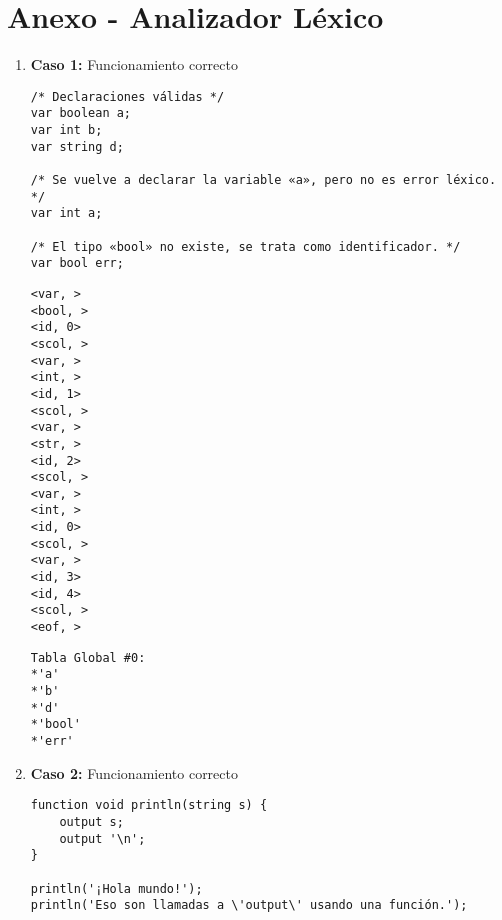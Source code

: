 \appendix
\section{Anexo - Analizador Léxico}


\begin{enumerate}

    \item \textbf{Caso 1:} Funcionamiento correcto
    \begin{tcolorbox}[title={Código fuente}, colback=white]
        \begin{lstlisting}
/* Declaraciones válidas */
var boolean a;
var int b;
var string d;

/* Se vuelve a declarar la variable «a», pero no es error léxico. */
var int a;

/* El tipo «bool» no existe, se trata como identificador. */
var bool err;
        \end{lstlisting}
    \end{tcolorbox}

    \begin{tcolorbox}[title={Volcado del fichero de tokens}, colback=white]
        \begin{lstlisting}
<var, >
<bool, >
<id, 0>
<scol, >
<var, >
<int, >
<id, 1>
<scol, >
<var, >
<str, >
<id, 2>
<scol, >
<var, >
<int, >
<id, 0>
<scol, >
<var, >
<id, 3>
<id, 4>
<scol, >
<eof, >
        \end{lstlisting}
    \end{tcolorbox}

    \begin{tcolorbox}[title={Volcado del fichero de la tabla de símbolos}, colback=white]
        \begin{lstlisting}
Tabla Global #0:
*'a'
*'b'
*'d'
*'bool'
*'err'
        \end{lstlisting}
    \end{tcolorbox}


    \item \textbf{Caso 2:} Funcionamiento correcto
    \begin{tcolorbox}[title={Código fuente}, colback=white]
        \begin{lstlisting}
function void println(string s) {
    output s;
    output '\n';
}

println('¡Hola mundo!');
println('Eso son llamadas a \'output\' usando una función.');
        \end{lstlisting}
    \end{tcolorbox}


\end{enumerate}
